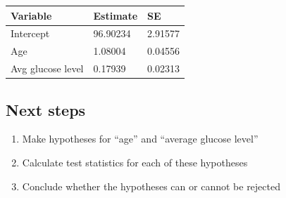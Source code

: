 \documentclass[boxes, qed]{homework}
\begin{document}
\begin{tabular}{l|l|l}\hline
  Variable & Estimate & SE\\\hline
  Intercept & 96.90234 & 2.91577\\
  Age & 1.08004 & 0.04556\\
  Avg glucose level & 0.17939 & 0.02313
\end{tabular}

\subsection*{Next steps}
\begin{enumerate}
  \item Make hypotheses for ``age'' and ``average glucose level''
  \item Calculate test statistics for each of these hypotheses
  \item Conclude whether the hypotheses can or cannot be rejected
\end{enumerate}
\pagebreak
\printbibliography
\end{document}
